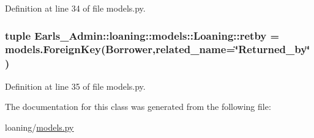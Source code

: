 Definition at line 34 of file models.py.\hypertarget{classEarls__Admin_1_1loaning_1_1models_1_1Loaning_0f03fc941e45181b1c0ce8a51370e924}{
\subsubsection[retby]{\setlength{\rightskip}{0pt plus 5cm}tuple {\bf Earls\_\-Admin::loaning::models::Loaning::retby} = models.ForeignKey({\bf Borrower},related\_\-name=\char`\"{}Returned\_\-by\char`\"{})}}
\label{classEarls__Admin_1_1loaning_1_1models_1_1Loaning_0f03fc941e45181b1c0ce8a51370e924}




Definition at line 35 of file models.py.

The documentation for this class was generated from the following file:\begin{CompactItemize}
\item 
loaning/\hyperlink{loaning_2models_8py}{models.py}\end{CompactItemize}

